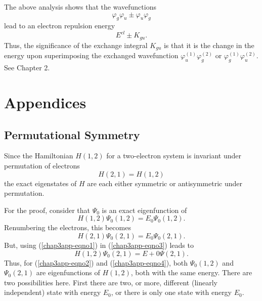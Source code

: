 The above analysis shows that the wavefunctions
\begin{equation}
\varphi_g \varphi_u \pm \varphi_u \varphi_g
\end{equation}
lead to an electron repulsion energy
\begin{equation}
E^{cl} \pm K_{gu} .
\end{equation}
Thus, the significance of the exchange integral $K_{gu}$ is that it is
the change in the energy upon superimposing the exchanged wavefunction
$\varphi^{(1)}_u \varphi^{(2)}_g$ or $\varphi^{(1)}_g
\varphi^{(2)}_u$. See Chapter 2.

\section{Appendices}

\subsection{Permutational Symmetry}
\label{chap3-app-a}

Since the Hamiltonian $H(1,2)$ for a two-electron system is invariant 
under permutation of electrons
\begin{equation}
H(2,1) = H(1,2)
\label{chap3app-eqno1}
\end{equation}
the exact eigenstates of $H$ are each either symmetric or antisymmetric 
under permutation.

For the proof, consider that $\Psi_0$ is an exact eigenfunction of
\begin{equation}
H(1,2) \Psi_0 (1,2) = E_0 \Psi_0 (1,2).
\label{chap3app-eqno2}
\end{equation}
Renumbering the electrons, this becomes
\begin{equation}
H(2,1) \Psi_0 (2,1) = E_0 \Psi_0 (2,1).
\label{chap3app-eqno3}
\end{equation}
But, using (\ref{chap3app-eqno1}) in (\ref{chap3app-eqno3}) leads to
\begin{equation}
H(1,2) \Psi_0 (2,1) = E+0 \Psi(2,1).
\label{chap3app-eqno4}
\end{equation}
Thus, for (\ref{chap3app-eqno2}) and (\ref{chap3app-eqno4}), both
$\Psi_0(1, 2)$ and $\Psi_0(2, 1)$ are eigenfunctions of $H(1,2)$, both
with the same energy.  There are two possibilities here. First there
are two, or more, different (linearly independent) state with energy
$E_0$, or there is only one state with energy $E_0$.

